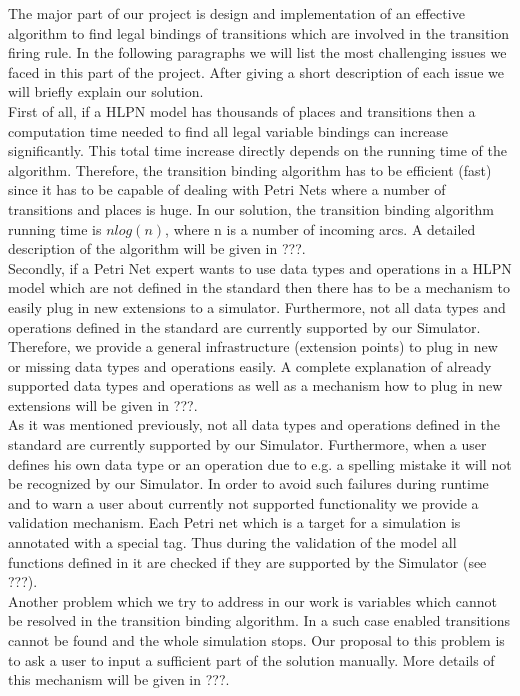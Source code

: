 The major part of our project is design and implementation of an effective algorithm to find legal bindings of transitions which are involved in the transition firing rule. In the following paragraphs we will list the most challenging issues we faced in this part of the project. After giving a short description of each issue we will briefly explain our solution.
\\First of all, if a HLPN model has thousands of places and transitions then a computation time needed to find all legal variable bindings can increase significantly. This total time increase directly depends on the running time of the algorithm. Therefore, the transition binding algorithm has to be efficient (fast) since it has to be capable of dealing with Petri Nets where a number of transitions and places is huge. In our solution, the transition binding algorithm running time is $nlog(n)$, where n is a number of incoming arcs. A detailed description of the algorithm will be given in ???.
\\Secondly, if a Petri Net expert wants to use data types and operations in a HLPN model which are not defined in the standard then there has to be a mechanism to easily plug in new extensions to a simulator. Furthermore, not all data types and operations defined in the standard are currently supported by our Simulator. Therefore, we provide a general infrastructure (extension points) to plug in new or missing data types and operations easily. A complete explanation of already supported data types and operations as well as a mechanism how to plug in new extensions will be given in ???.
\\As it was mentioned previously, not all data types and operations defined in the standard are currently supported by our Simulator. Furthermore, when a user defines his own data type or an operation due to e.g. a spelling mistake it will not be recognized by our Simulator. In order to avoid such failures during runtime and to warn a user about currently not supported functionality we provide a validation mechanism. Each Petri net which is a target for a simulation is annotated with a special tag. Thus during the validation of the model all functions defined in it are checked if they are supported by the Simulator (see ???).
\\Another problem which we try to address in our work is variables which cannot be resolved in the transition binding algorithm. In a such case enabled transitions cannot be found and the whole simulation stops. Our proposal to this problem is to ask a user to input a sufficient part of the solution manually. More details of this mechanism will be given in ???.
